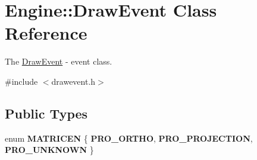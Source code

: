 \hypertarget{classEngine_1_1DrawEvent}{}\section{Engine\+:\+:Draw\+Event Class Reference}
\label{classEngine_1_1DrawEvent}


The \hyperlink{classEngine_1_1DrawEvent}{Draw\+Event} -\/ event class.  




{\ttfamily \#include $<$drawevent.\+h$>$}

\subsection*{Public Types}
\begin{DoxyCompactItemize}
\item 
\hypertarget{classEngine_1_1DrawEvent_ae318662b3a1237df5fab4d791e6fbe3b}{}enum {\bfseries M\+A\+T\+R\+I\+C\+E\+N} \{ {\bfseries P\+R\+O\+\_\+\+O\+R\+T\+H\+O}, 
{\bfseries P\+R\+O\+\_\+\+P\+R\+O\+J\+E\+C\+T\+I\+O\+N}, 
{\bfseries P\+R\+O\+\_\+\+U\+N\+K\+N\+O\+W\+N}
 \}\label{classEngine_1_1DrawEvent_ae318662b3a1237df5fab4d791e6fbe3b}

\end{DoxyCompactItemize}
